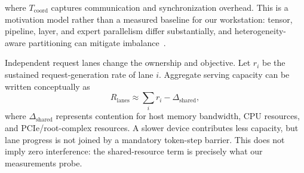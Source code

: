 where $T_{\mathrm{coord}}$ captures communication and synchronization overhead. This is a motivation model rather than a measured baseline for our workstation: tensor, pipeline, layer, and expert parallelism differ substantially, and heterogeneity-aware partitioning can mitigate imbalance~\cite{hexgen,helix}.

Independent request lanes change the ownership and objective. Let $r_i$ be the sustained request-generation rate of lane $i$. Aggregate serving capacity can be written conceptually as
\begin{equation}
R_{\mathrm{lanes}} \approx \sum_i r_i - \Delta_{\mathrm{shared}},
\label{eq:aggregate}
\end{equation}
where $\Delta_{\mathrm{shared}}$ represents contention for host memory bandwidth, CPU resources, and PCIe/root-complex resources. A slower device contributes less capacity, but lane progress is not joined by a mandatory token-step barrier. This does not imply zero interference: the shared-resource term is precisely what our measurements probe.

